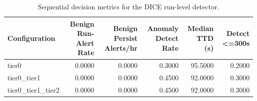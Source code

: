 \begin{table}[t]
\centering
\caption{Sequential decision metrics for the DICE run-level detector.}
\label{tab:dice_sequential_metrics}
\footnotesize
\begin{tabular}{lrrrrr}
\toprule
Configuration & Benign Run-Alert Rate & Benign Persist Alerts/hr & Anomaly Detect Rate & Median TTD (s) & Detect <=300s \\
\midrule
tier0 & 0.0000 & 0.0000 & 0.3000 & 95.5000 & 0.2000 \\
tier0_tier1 & 0.0000 & 0.0000 & 0.4500 & 92.0000 & 0.3000 \\
tier0_tier1_tier2 & 0.0000 & 0.0000 & 0.4500 & 92.0000 & 0.3000 \\
\bottomrule
\end{tabular}

\end{table}
